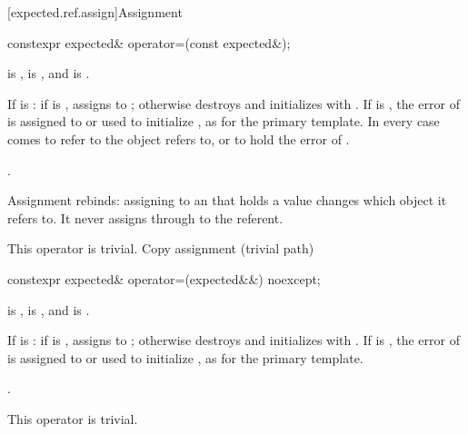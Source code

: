 [expected.ref.assign]{Assignment}

%
\begin{itemdecl}
constexpr expected& operator=(const expected&);
\end{itemdecl}

\begin{itemdescr}
\pnum
\constraints
{} is ,  is , and  is .

\pnum
\effects
If  is : if  is , assigns  to ; otherwise destroys  and initializes  with . If  is , the error of  is assigned to or used to initialize , as for the primary template. In every case  comes to refer to the object  refers to, or to hold the error of .

\pnum
\returns
{}.

\pnum
\remarks
Assignment rebinds: assigning to an  that holds a value changes which object it refers to. It never assigns through to the referent.

\pnum
This operator is trivial. Copy assignment (trivial path)
\end{itemdescr}

%
\begin{itemdecl}
constexpr expected& operator=(expected&&) noexcept;
\end{itemdecl}

\begin{itemdescr}
\pnum
\constraints
{} is ,  is , and  is .

\pnum
\effects
If  is : if  is , assigns  to ; otherwise destroys  and initializes  with . If  is , the error of  is assigned to or used to initialize , as for the primary template.

\pnum
\returns
{}.

\pnum
\remarks
This operator is trivial.
\end{itemdescr}

